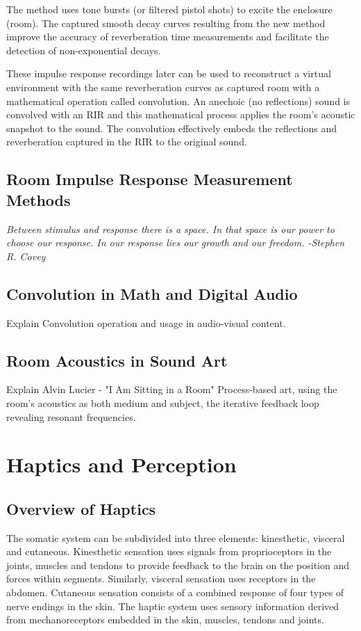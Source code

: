             The method uses tone bursts (or filtered pistol shots) to excite the enclosure (room). The captured smooth decay curves resulting from the new method improve the accuracy of reverberation time measurements and facilitate the detection of non-exponential decays\cite{New_Method_Measuring_RT}.\par

            These impulse response recordings later can be used to reconstruct a virtual environment with the same reverberation curves as captured room with a mathematical operation called convolution. An anechoic (no reflections) sound is convolved with an RIR and this mathematical process applies the room's acoustic snapshot to the sound. The convolution effectively embeds the reflections and reverberation captured in the RIR to the original sound.
        \subsection{Room Impulse Response Measurement Methods}
        \emph{Between stimulus and response there is a space. In that space is our power to choose our response. In our response lies our growth and our freedom. -Stephen R. Covey\cite{Sonic_Interaction_in_Virtual_Environments}}
        \subsection{Convolution in Math and Digital Audio} Explain Convolution operation and usage in audio-visual content.
        \subsection{Room Acoustics in Sound Art} Explain Alvin Lucier - "I Am Sitting in a Room" Process-based art, using the room's acoustics as both medium and subject, the iterative feedback loop revealing resonant frequencies.
    \section{Haptics and Perception}
        \subsection{Overview of Haptics}
            The somatic system can be subdivided into three elements: kinesthetic, visceral and cutaneous. Kinesthetic sensation uses signals from proprioceptors in the joints, muscles and tendons to provide feedback to the brain on the position and forces within segments. Similarly, visceral sensation uses receptors in the abdomen. Cutaneous sensation consists of a combined response of four types of nerve endings in the skin\cite{Blank}. The haptic system uses sensory information derived from mechanoreceptors embedded in the skin, muscles, tendons and joints\cite{Blank}.\par

